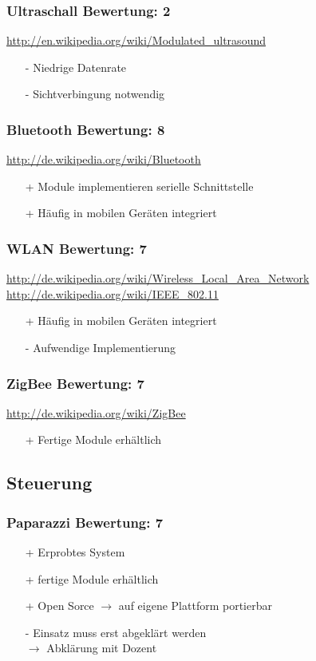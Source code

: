 \subsubsection{Ultraschall \hfill Bewertung: 2}
\url{http://en.wikipedia.org/wiki/Modulated_ultrasound}
\begin{itemize}
    \item[-] Niedrige Datenrate
    \item[-] Sichtverbingung notwendig
\end{itemize}

\subsubsection{Bluetooth \hfill Bewertung: 8}
\url{http://de.wikipedia.org/wiki/Bluetooth}
\begin{itemize}
    \item[+] Module implementieren serielle Schnittstelle
    \item[+] Häufig in mobilen Geräten integriert
\end{itemize}

\subsubsection{WLAN \hfill Bewertung: 7}
\url{http://de.wikipedia.org/wiki/Wireless_Local_Area_Network} \\
\url{http://de.wikipedia.org/wiki/IEEE_802.11}
\begin{itemize}
    \item[+] Häufig in mobilen Geräten integriert
    \item[-] Aufwendige Implementierung
\end{itemize}

\subsubsection{ZigBee \hfill Bewertung: 7}
\url{http://de.wikipedia.org/wiki/ZigBee}
\begin{itemize}
    \item[+] Fertige Module erhältlich
\end{itemize}

\subsection{Steuerung}

\subsubsection{Paparazzi \hfill Bewertung: 7}
\begin{itemize}
    \item[+] Erprobtes System
    \item[+] fertige Module erhältlich
    \item[+] Open Sorce $\to$ auf eigene Plattform portierbar
    \item[-] Einsatz muss erst abgeklärt werden \\
        $\to$ Abklärung mit Dozent
\end{itemize}

